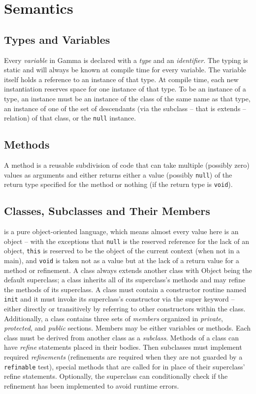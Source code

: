 \section{Semantics}
\subsection{Types and Variables}
Every \textit{variable} in Gamma is declared with a \textit{type} and an \textit{identifier}. The typing is static and will always be known at compile time for every variable. The variable itself holds a reference to an instance of that type. At compile time, each new instantiation reserves space for one instance of that type. To be an instance of a type, an instance must be an instance of the class of the same name as that type, an instance of one of the set of descendants (via the subclass -- that is extends -- relation) of that class, or the {\tt null} instance.
\subsection{Methods}
A method is a reusable subdivision of code that can take multiple (possibly zero) values as arguments and either returns either a value (possibly {\tt null}) of the return type specified for the method or nothing (if the return type is {\tt void}).
\subsection{Classes, Subclasses and Their Members}
\Lang{} is a pure object-oriented language, which means almost every value here is an object -- with the exceptions that {\tt null} is the reserved reference for the lack of an object, {\tt this} is reserved to be the object of the current context (when not in a main), and {\tt void} is taken not as a value but at the lack of a return value for a method or refinement. A class always extends another class with Object being the default superclass; a class inherits all of its superclass's methods and may refine the methods of its superclass. A class must contain a constructor routine named {\tt init} and it must invoke its superclass's constructor via the super keyword -- either directly or transitively by referring to other constructors within the class. Additionally, a class contains three sets of \textit{members} organized in \textit{private}, \textit{protected}, and \textit{public} sections. Members may be either variables or methods. Each class must be derived from another class as a \textit{subclass}. Methods of a class can have \textit{refine} statements placed in their bodies. Then subclasses must implement required \textit{refinements} (refinements are required when they are not guarded by a {\tt refinable} test), special methods that are called for in place of their superclass' refine statements. Optionally, the superclass can conditionally check if the refinement has been implemented to avoid runtime errors.

